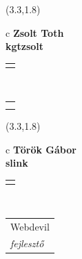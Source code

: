 \documentclass[11pt]{article}
\begin{document}
\makebox(3.3,1.8){
  \renewcommand\arraystretch{1.3}
  \begin{tabular}[c]{c}
    \hspace{8.5mm}
    \LARGE\bf{ Zsolt Toth }\\
    \hspace{8.5mm}
    \Large{ kgtzsolt }\\
    \renewcommand\arraystretch{3}
    \begin{tabular}[c]{c}
      \centering
      \fontfamily{phv}\selectfont{
        \textbf{
          \textsc{
            \scriptsize{
            \color{Bright}{ Ismerkedő }\color{Bright}{ Webmester }\color{Bright}{ Sminkmester }\color{Bright}{ Programozó }
            }
          }
        }
      }
    \end{tabular}
    \\
    \renewcommand\arraystretch{1}
    \begin{tabular}{p{3.3in}}
      \hspace{.7cm}\\
      \hspace{.7cm}\emph{  }\\
    \end{tabular}
  \end{tabular}
}

\makebox(3.3,1.8){
  \renewcommand\arraystretch{1.3}
  \begin{tabular}[c]{c}
    \hspace{8.5mm}
    \LARGE\bf{ Török Gábor }\\
    \hspace{8.5mm}
    \Large{ slink }\\
    \renewcommand\arraystretch{3}
    \begin{tabular}[c]{c}
      \centering
      \fontfamily{phv}\selectfont{
        \textbf{
          \textsc{
            \scriptsize{
            \color{Dark}{ Ismerkedő }\color{Dark}{ Webmester }\color{Bright}{ Sminkmester }\color{Bright}{ Programozó }
            }
          }
        }
      }
    \end{tabular}
    \\
    \renewcommand\arraystretch{1}
    \begin{tabular}{p{3.3in}}
      \hspace{.7cm}Webdevil\\
      \hspace{.7cm}\emph{ fejlesztő }\\
    \end{tabular}
  \end{tabular}
}
\end{document}

